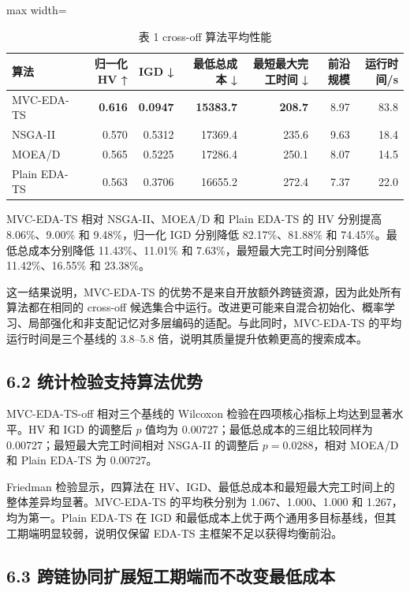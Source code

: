 \documentclass[UTF8,11pt]{ctexart}
\begin{document}
\begin{table}[H]
\centering
\caption{表 1 cross-off 算法平均性能}
\small
\begin{adjustbox}{max width=\textwidth}
\begin{tabular}{lrrrrrr}
\toprule
算法 & 归一化 HV ↑ & IGD ↓ & 最低总成本 ↓ & 最短最大完工时间 ↓ & 前沿规模 & 运行时间/s \\
\midrule
MVC-EDA-TS & \textbf{0.616} & \textbf{0.0947} & \textbf{15383.7} & \textbf{208.7} & 8.97 & 83.8 \\
NSGA-II & 0.570 & 0.5312 & 17369.4 & 235.6 & 9.63 & 18.4 \\
MOEA/D & 0.565 & 0.5225 & 17286.4 & 250.1 & 8.07 & 14.5 \\
Plain EDA-TS & 0.563 & 0.3706 & 16655.2 & 272.4 & 7.37 & 22.0 \\
\bottomrule
\end{tabular}
\end{adjustbox}
\end{table}

MVC-EDA-TS 相对 NSGA-II、MOEA/D 和 Plain EDA-TS 的 HV 分别提高 8.06\%、9.00\% 和 9.48\%，归一化 IGD 分别降低 82.17\%、81.88\% 和 74.45\%。最低总成本分别降低 11.43\%、11.01\% 和 7.63\%，最短最大完工时间分别降低 11.42\%、16.55\% 和 23.38\%。

这一结果说明，MVC-EDA-TS 的优势不是来自开放额外跨链资源，因为此处所有算法都在相同的 cross-off 候选集合中运行。改进更可能来自混合初始化、概率学习、局部强化和非支配记忆对多层编码的适配。与此同时，MVC-EDA-TS 的平均运行时间是三个基线的 3.8–5.8 倍，说明其质量提升依赖更高的搜索成本。

\subsection*{6.2 统计检验支持算法优势}

MVC-EDA-TS-off 相对三个基线的 Wilcoxon 检验在四项核心指标上均达到显著水平。HV 和 IGD 的调整后 \(p\) 值均为 0.00727；最低总成本的三组比较同样为 0.00727；最短最大完工时间相对 NSGA-II 的调整后 \(p=0.0288\)，相对 MOEA/D 和 Plain EDA-TS 为 0.00727。

Friedman 检验显示，四算法在 HV、IGD、最低总成本和最短最大完工时间上的整体差异均显著。MVC-EDA-TS 的平均秩分别为 1.067、1.000、1.000 和 1.267，均为第一。Plain EDA-TS 在 IGD 和最低成本上优于两个通用多目标基线，但其工期端明显较弱，说明仅保留 EDA-TS 主框架不足以获得均衡前沿。

\subsection*{6.3 跨链协同扩展短工期端而不改变最低成本}
\end{document}
